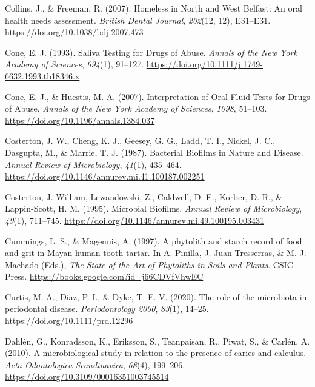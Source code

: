 \documentclass[
  letterpaper,
]{book}
\newlength{\cslhangindent}
\newlength{\cslentryspacingunit} %
\newenvironment{CSLReferences}[2] %
 {%
  \setlength{\parindent}{0pt}
  \ifodd #1
  \let\oldpar\par
  \def\par{\hangindent=\cslhangindent\oldpar}
  \fi
  \setlength{\parskip}{#2\cslentryspacingunit}
 }%
 {}
\begin{document}
\begin{CSLReferences}{1}{0}
\leavevmode{}%
Collins, J., \& Freeman, R. (2007). Homeless in {North} and {West
Belfast}: An oral health needs assessment. \emph{British Dental
Journal}, \emph{202}(12, 12), E31--E31.
\url{https://doi.org/10.1038/bdj.2007.473}

\leavevmode{}%
Cone, E. J. (1993). Saliva {Testing} for {Drugs} of {Abuse}.
\emph{Annals of the New York Academy of Sciences}, \emph{694}(1),
91--127. \url{https://doi.org/10.1111/j.1749-6632.1993.tb18346.x}

\leavevmode{}%
Cone, E. J., \& Huestis, M. A. (2007). Interpretation of {Oral Fluid
Tests} for {Drugs} of {Abuse}. \emph{Annals of the New York Academy of
Sciences}, \emph{1098}, 51--103.
\url{https://doi.org/10.1196/annals.1384.037}

\leavevmode{}%
Costerton, J. W., Cheng, K. J., Geesey, G. G., Ladd, T. I., Nickel, J.
C., Dasgupta, M., \& Marrie, T. J. (1987). Bacterial {Biofilms} in
{Nature} and {Disease}. \emph{Annual Review of Microbiology},
\emph{41}(1), 435--464.
\url{https://doi.org/10.1146/annurev.mi.41.100187.002251}

\leavevmode{}%
Costerton, J. William, Lewandowski, Z., Caldwell, D. E., Korber, D. R.,
\& Lappin-Scott, H. M. (1995). Microbial {Biofilms}. \emph{Annual Review
of Microbiology}, \emph{49}(1), 711--745.
\url{https://doi.org/10.1146/annurev.mi.49.100195.003431}

\leavevmode{}%
Cummings, L. S., \& Magennis, A. (1997). A phytolith and starch record
of food and grit in {Mayan} human tooth tartar. In A. Pinilla, J.
Juan-Tresserras, \& M. J. Machado (Eds.), \emph{The {State-of-the-Art}
of {Phytoliths} in {Soils} and {Plants}}. {CSIC Press}.
\url{https://books.google.com?id=j66CDVfVhwEC}

\leavevmode{}%
Curtis, M. A., Diaz, P. I., \& Dyke, T. E. V. (2020). The role of the
microbiota in periodontal disease. \emph{Periodontology 2000},
\emph{83}(1), 14--25. \url{https://doi.org/10.1111/prd.12296}

\leavevmode{}%
Dahlén, G., Konradsson, K., Eriksson, S., Teanpaisan, R., Piwat, S., \&
Carlén, A. (2010). A microbiological study in relation to the presence
of caries and calculus. \emph{Acta Odontologica Scandinavica},
\emph{68}(4), 199--206. \url{https://doi.org/10.3109/00016351003745514}


\end{CSLReferences}
\end{document}
